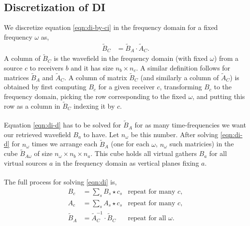 \documentclass[a4paper,12pt]{article}
\begin{document}
\subsection*{Discretization of DI}
We discretize equation \ref{eqn:di-by-ci} in the frequency domain for a fixed frequency $\omega$ as, 
\begin{align}
\tilde{B}_C &= \tilde{B}_A \cdot \tilde{A}_C.
\label{eqn:di-d}
\end{align}
A column of $\tilde{B}_C$ is the wavefield in the frequency domain (with fixed $\omega$) from a source $c$ to receivers $b$ and it has size $n_b\times n_c$. A similar definition follows for matrices $\tilde{B}_A$ and $\tilde{A}_C$. A column of matrix $\tilde{B}_C$ (and similarly a column of $\tilde{A}_C$) is obtained by first computing $B_c$ for a given receiver $c$, transforming $B_c$ to the frequency domain, picking the row corresponding to the fixed $\omega$, and putting this row as a column in $\tilde{B}_C$ indexing it by $c$.
\\\\
Equation \ref{eqn:di-d} has to be solved for $\tilde{B}_A$ for as many time-frequencies we want our retrieved wavefield $B_a$ to have. Let $n_\omega$ be this number. After solving \ref{eqn:di-d} for $n_\omega$ times we arrange each $\tilde{B}_A$ (one for each $\omega$, $n_\omega$ such matricies) in the cube $\tilde{B}_{A\omega}$ of size $n_\omega\times n_b\times n_a$. This cube holds all virtual gathers $B_a$ for all virtual sources $a$ in the frequency domain as vertical planes fixing $a$.
\\\\
The full process for solving \ref{eqn:di} is,
\begin{align}
B_c &= \sum_s B_s \star c_s & \text{repeat for many $c$},\\
A_c &= \sum_s A_s \star c_s & \text{repeat for many $c$},\\
\tilde{B}_A &= \tilde{A}_C^{-1}\cdot \tilde{B}_C & \text{repeat for all $\omega$}.
\end{align}
\end{document}
